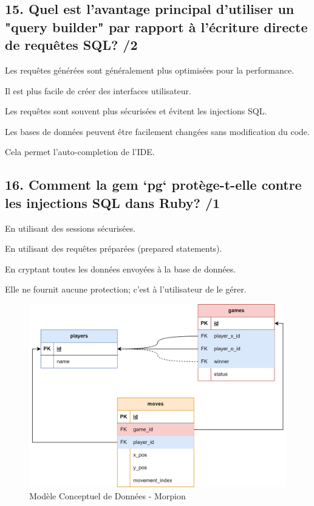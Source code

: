 \documentclass[12pt,a4paper]{article}
\begin{document}
\begin{flushleft}
\subsection*{15. Quel est l'avantage principal d'utiliser un "query builder" par rapport à l'écriture directe de requêtes SQL? /2}
\begin{choices}
    \item Les requêtes générées sont généralement plus optimisées pour la performance.
    \item Il est plus facile de créer des interfaces utilisateur.
    \item Les requêtes sont souvent plus sécurisées et évitent les injections SQL.
    \item Les bases de données peuvent être facilement changées sans modification du code.
    \item Cela permet l'auto-completion de l'IDE.
\end{choices}

\subsection*{16. Comment la gem `pg` protège-t-elle contre les injections SQL dans Ruby? /1}
\begin{choices}
    \item En utilisant des sessions sécurisées.
    \item En utilisant des requêtes préparées (prepared statements).
    \item En cryptant toutes les données envoyées à la base de données.
    \item Elle ne fournit aucune protection; c'est à l'utilisateur de le gérer.
\end{choices}

\begin{figure}[H]
    \centering
    \includegraphics[width=1\textwidth]{tictactoe_mcd.png}
    \caption{Modèle Conceptuel de Données - Morpion}
\end{figure}


\end{flushleft}
\end{document}
